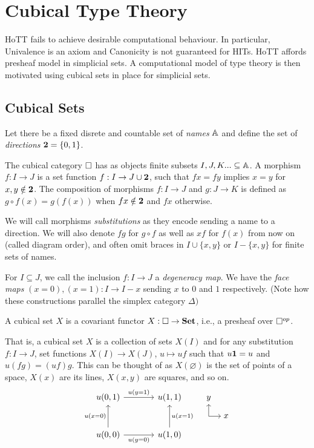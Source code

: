 \section{Cubical Type Theory}

HoTT fails to achieve desirable computational behaviour.
In particular, Univalence is an axiom and Canonicity is not guaranteed for HITs.
HoTT affords presheaf model in simplicial sets.  
A computational model of type theory is then motivated using cubical sets in place for simplicial sets. 

\subsection{Cubical Sets}
Let there be a fixed disrete and countable set of \emph{names} $\mathbb{A}$ and define the set of \emph{directions} $\mathbf{2} = \{0,1\}$.
\begin{definition}
  The cubical category $\mathbf{\square}$ has as objects finite subsets $I, J, K... \subseteq \mathbb{A}$.
  A morphism $f : I \to J$ is a set function $f : I \to J \cup \mathbf{2}$, such that 
  $f x = f y$ implies $x = y$ for $x,y \notin \mathbf{2}$. 
  The composition of morphisms $f : I \to J$ and $g : J \to K$ is defined as 
    $g \circ f (x) = g(f(x))$ when $f x \notin \mathbf{2}$ and $f x$ otherwise.
  
\end{definition}
We will call morphisms \emph{substitutions} as they encode sending a name to a direction.
We will also denote $fg$ for $g \circ f$ as well as $xf$ for $f(x)$ from now on (called diagram order),
and often omit braces in $I \cup \{x, y\}$ or $I - \{x,y\}$ for finite sets of names.

For $I \subseteq J$, we call the inclusion $f : I \to J$ a \emph{degeneracy map}. 
We have the \emph{face maps} $(x = 0), (x = 1) : I  \to I - x$ sending $x$ to $0$ and $1$ respectively. (Note how these constructions parallel the simplex category ${\Delta})$
\begin{definition}
  A cubical set $X$ is a covariant functor $X : \mathbf{\square} \to \mathbf{Set}$, i.e., a presheaf over $\mathbf{\square}^{op}$.
\end{definition}
That is, a cubical set $X$ is a collection of sets $X(I)$ and for any substitution $f : I \to J$, set functions $X(I) \to X(J)$, $u \mapsto uf$ such that $u\mathbf{1} = u$ and $u(fg) = (uf)g$.
This can be thought of as $X(\varnothing)$ is the set of points of a space, $X(x)$ are its lines, $X(x,y)$ are squares, and so on.
\[
\begin{tikzcd}[row sep=large, column sep=large]
u(0,1) \arrow[r, "u(y=1)"] & u(1,1)\\
u(0,0) \arrow[u, "u(x=0)"] \arrow[r, "u(y=0)"']  & u(1,0) \arrow[u, "u(x=1)"']
\end{tikzcd}
\quad
\begin{tikzpicture}[baseline={(0,0)}]
  \draw[->] (0,0) -- (0.5,0) node[right] {$x$};
  \draw[->] (0,0) -- (0,0.5) node[above] {$y$};
\end{tikzpicture}
\]

